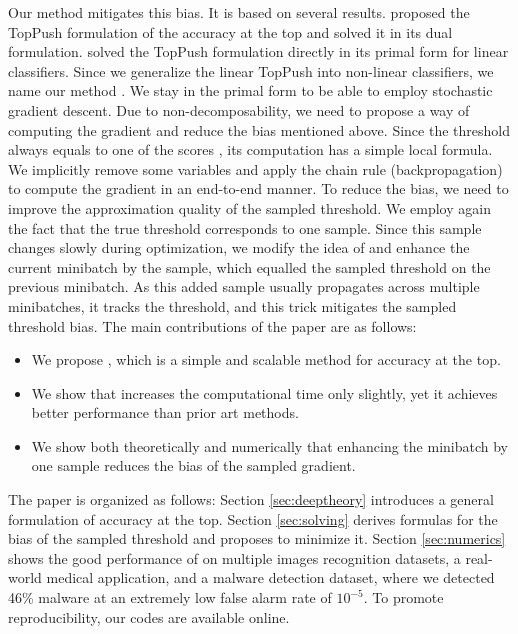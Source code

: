 Our method mitigates this bias. It is based on several results. \cite{li2014top} proposed the TopPush formulation of the accuracy at the top and solved it in its dual formulation. \cite{adam2019patmat} solved the TopPush formulation directly in its primal form for linear classifiers. Since we generalize the linear TopPush into non-linear classifiers, we name our method \DeepTopPush. We stay in the primal form to be able to employ stochastic gradient descent. Due to non-decomposability, we need to propose a way of computing the gradient and reduce the bias mentioned above. Since the threshold always equals to one of the scores \cite{boyd2012accuracy}, its computation has a simple local formula. We implicitly remove some variables and apply the chain rule (backpropagation) to compute the gradient in an end-to-end manner. To reduce the bias, we need to improve the approximation quality of the sampled threshold. We employ again the fact that the true threshold corresponds to one sample. Since this sample changes slowly during optimization, we modify the idea of \cite{adam2019machine} and enhance the current minibatch by the sample, which equalled the sampled threshold on the previous minibatch. As this added sample usually propagates across multiple minibatches, it tracks the threshold, and this trick mitigates the sampled threshold bias. The main contributions of the paper are as follows:
\begin{itemize}
  \item We propose \DeepTopPush, which is a simple and scalable method for accuracy at the top.
  \item We show that \DeepTopPush increases the computational time only slightly, yet it achieves better performance than prior art methods.
  \item We show both theoretically and numerically that enhancing the minibatch by one sample reduces the bias of the sampled gradient.
\end{itemize}
The paper is organized as follows: Section \ref{sec:deeptheory} introduces a general formulation of accuracy at the top. Section \ref{sec:solving} derives formulas for the bias of the sampled threshold and proposes \DeepTopPush to minimize it. Section \ref{sec:numerics} shows the good performance of \DeepTopPush on multiple images recognition datasets, a real-world medical application, and a malware detection dataset, where we detected 46\% malware at an extremely low false alarm rate of $10^{-5}$. To promote reproducibility, our codes are available online.

